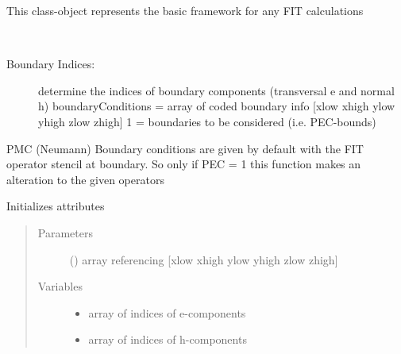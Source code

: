 \documentclass[letterpaper,10pt,english]{sphinxmanual}
\begin{document}
\begin{fulllineitems}
\label{\detokenize{FIT:FIT.FIT}}
This class-object represents the basic framework for any FIT calculations

\begin{fulllineitems}
\label{\detokenize{FIT:FIT.FIT.boundaryIndices}}~\begin{description}
\item[{Boundary Indices:}] \leavevmode
determine the indices of boundary components (transversal e and normal h)
boundaryConditions = array of coded boundary info {[}xlow xhigh ylow yhigh zlow zhigh{]} 
1 = boundaries to be considered (i.e. PEC-bounds)

\end{description}

PMC (Neumann) Boundary conditions are given by default with the FIT operator stencil at boundary. So only if PEC = 1 this function makes an alteration to the given operators

Initializes attributes
\begin{quote}\begin{description}
\item[{Parameters}] \leavevmode
{} () \textendash{} array referencing {[}xlow xhigh ylow yhigh zlow zhigh{]}

\item[{Variables}] \leavevmode\begin{itemize}
\item {} 
 \textendash{} array of indices of e-components

\item {} 
 \textendash{} array of indices of h-components

\end{itemize}

\end{description}\end{quote}

\end{fulllineitems}


\end{fulllineitems}
\end{document}
